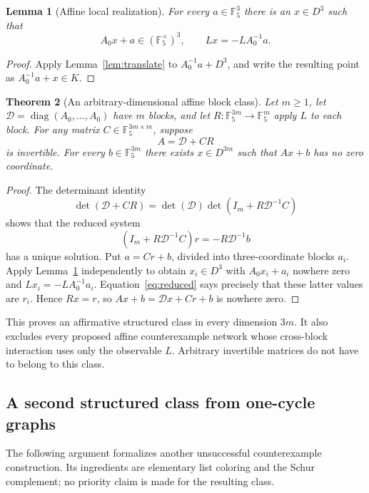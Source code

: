 \documentclass[11pt,a4paper]{article}
\newtheorem{theorem}{Theorem}
\newtheorem{lemma}[theorem]{Lemma}
\newcommand{\F}{\mathbb F_5}
\newcommand{\diag}{\operatorname{diag}}
\begin{document}
\begin{lemma}[Affine local realization]\label{lem:local}
For every $a\in\F^3$ there is an $x\in D^3$ such that
\[
 A_0x+a\in(\F^\times)^3,
 \qquad Lx=-LA_0^{-1}a.
\]
\end{lemma}
\begin{proof}
Apply Lemma~\ref{lem:translate} to $A_0^{-1}a+D^3$, and write the
resulting point as $A_0^{-1}a+x\in K$.
\end{proof}

\begin{theorem}[An arbitrary-dimensional affine block class]\label{thm:network}
Let $m\ge1$, let $\mathcal D=\diag(A_0,\ldots,A_0)$ have $m$ blocks,
and let $R:\F^{3m}\to\F^m$ apply $L$ to each block. For any matrix
$C\in\F^{3m\times m}$, suppose
\[
 A=\mathcal D+CR
\]
is invertible. For every $b\in\F^{3m}$ there exists $x\in D^{3m}$
such that $Ax+b$ has no zero coordinate.
\end{theorem}
\begin{proof}
The determinant identity
\[
 \det(\mathcal D+CR)=\det(\mathcal D)
       \det(I_m+R\mathcal D^{-1}C)
\]
shows that the reduced system
\begin{equation}\label{eq:reduced}
 (I_m+R\mathcal D^{-1}C)r=-R\mathcal D^{-1}b
\end{equation}
has a unique solution. Put $a=Cr+b$, divided into three-coordinate
blocks $a_i$. Apply Lemma~\ref{lem:local} independently to obtain
$x_i\in D^3$ with $A_0x_i+a_i$ nowhere zero and
$Lx_i=-LA_0^{-1}a_i$. Equation~\eqref{eq:reduced} says precisely that
these latter values are $r_i$. Hence $Rx=r$, so
$Ax+b=\mathcal D x+Cr+b$ is nowhere zero.
\end{proof}

This proves an affirmative structured class in every dimension $3m$.
It also excludes every proposed affine counterexample network whose
cross-block interaction uses only the observable $L$.
Arbitrary invertible matrices do not have to belong to this class.

\subsection{A second structured class from one-cycle graphs}

The following argument formalizes another unsuccessful counterexample
construction. Its ingredients are elementary list coloring and the Schur
complement; no priority claim is made for the resulting class.
\end{document}

